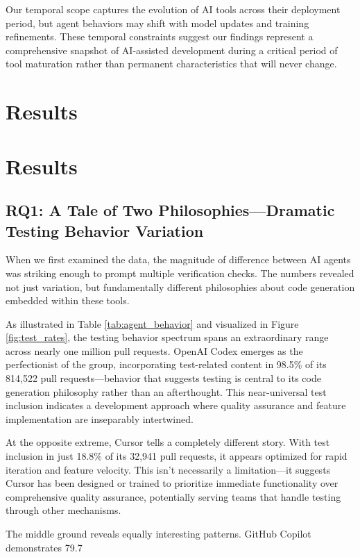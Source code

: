\documentclass[conference]{IEEEtran}
\begin{document}
Our temporal scope captures the evolution of AI tools across their deployment period, but agent behaviors may shift with model updates and training refinements. These temporal constraints suggest our findings represent a comprehensive snapshot of AI-assisted development during a critical period of tool maturation rather than permanent characteristics that will never change.

\section{Results}

\section{Results}

\subsection{RQ1: A Tale of Two Philosophies—Dramatic Testing Behavior Variation}

When we first examined the data, the magnitude of difference between AI agents was striking enough to prompt multiple verification checks. The numbers revealed not just variation, but fundamentally different philosophies about code generation embedded within these tools.

As illustrated in Table \ref{tab:agent_behavior} and visualized in Figure \ref{fig:test_rates}, the testing behavior spectrum spans an extraordinary range across nearly one million pull requests. OpenAI Codex emerges as the perfectionist of the group, incorporating test-related content in 98.5\% of its 814,522 pull requests—behavior that suggests testing is central to its code generation philosophy rather than an afterthought. This near-universal test inclusion indicates a development approach where quality assurance and feature implementation are inseparably intertwined.

At the opposite extreme, Cursor tells a completely different story. With test inclusion in just 18.8\% of its 32,941 pull requests, it appears optimized for rapid iteration and feature velocity. This isn't necessarily a limitation—it suggests Cursor has been designed or trained to prioritize immediate functionality over comprehensive quality assurance, potentially serving teams that handle testing through other mechanisms.

The middle ground reveals equally interesting patterns. GitHub Copilot demonstrates 79.7%
\end{document}
